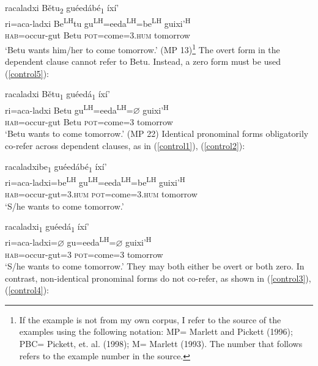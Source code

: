 \ea\label{control6}
\glll racaladxi B\v{e}tu\textsubscript{2} gu\'{e}ed\'{a}b\'{e}\textsubscript{1} \'{i}x\'{i}' \\
ri=aca-ladxi Be\textsuperscript{LH}tu gu\textsuperscript{LH}=eeda\textsuperscript{LH}=be\textsuperscript{LH}  guixi'\textsuperscript{H}  \\
\textsc{hab}=occur-gut Betu \textsc{pot}=come=\textsc{3.hum} tomorrow \\
\glt `Betu wants him/her to come tomorrow.'  \hfill{(MP 13)}\footnote{If the example is not from my own corpus, I refer to the source of the examples using the following notation: MP= Marlett and Pickett (1996); PBC= Pickett, et. al. (1998); M= Marlett (1993). The number that follows refers to the example number in the source.}
\z
The overt form in the dependent clause cannot refer to Betu. Instead, a zero form must be used (\ref{control5}):

\ea\label{control5}
\glll racaladxi B\v{e}tu\textsubscript{1} gu\'{e}ed\'{a}\textsubscript{1} \'{i}x\'{i}' \\
ri=aca-ladxi Betu gu\textsuperscript{LH}=eeda\textsuperscript{LH}={$\varnothing$} guixi'\textsuperscript{H}  \\
\textsc{hab}=occur-gut Betu \textsc{pot}=come=\textsc{3} tomorrow \\
\glt `Betu wants to come tomorrow.' \hfill{(MP 22)}
\z
Identical pronominal forms obligatorily co-refer across dependent clauses, as in (\ref{control1}), (\ref{control2}):

\ea\label{control1}
\glll racaladxibe\textsubscript{1} gu\'{e}ed\'{a}b\'{e}\textsubscript{1} \'{i}x\'{i}' \\
ri=aca-ladxi=be\textsuperscript{LH}  gu\textsuperscript{LH}=eeda\textsuperscript{LH}=be\textsuperscript{LH}  guixi'\textsuperscript{H}  \\
\textsc{hab}=occur-gut=\textsc{3.hum} \textsc{pot}=come=\textsc{3.hum} tomorrow \\
\glt `S/he wants to come tomorrow.'
\z

\ea\label{control2}
\glll racaladxi\textsubscript{1} gu\'{e}ed\'{a}\textsubscript{1} \'{i}x\'{i}' \\
ri=aca-ladxi={$\varnothing$} gu=eeda\textsuperscript{LH}={$\varnothing$} guixi'\textsuperscript{H}  \\
\textsc{hab}=occur-gut=\textsc{3} \textsc{pot}=come=\textsc{3} tomorrow \\
\glt `S/he wants to come tomorrow.'
\z
They may both either be overt or both zero. In contrast, non-identical pronominal forms do not co-refer, as shown in (\ref{control3}), (\ref{control4}):

